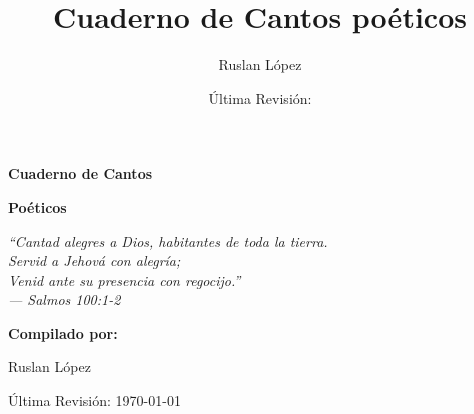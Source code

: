\documentclass[12pt, spanish]{book}
\title{Cuaderno de Cantos poéticos}
\author{Ruslan L\'opez}
\date{\'Ultima Revisi\'on:  \RevDate}
\newcommand{\RevDate}{\today}
\begin{document}
    \hypersetup{pageanchor=false}

    \begin{titlepage}
        \centering

        \vspace*{1cm}

        {\Huge\bfseries\sffamily{$\dagger$}\par}

        \vspace{1.5cm}

        {\Huge\bfseries\sffamily Cuaderno de Cantos\par}
        \vspace{0.5cm}
        {\Huge\bfseries\sffamily Po\'eticos\par}

        \vspace{2cm}

        \begin{center}
            \Large\itshape ``Cantad alegres a Dios, habitantes de toda la tierra.\\
            Servid a Jehov\'a con alegr\'ia;\\
            Venid ante su presencia con regocijo.''\\
            \vspace{0.3cm}
            --- Salmos 100:1-2
        \end{center}

        \vspace{2cm}

        {\Large\bfseries Compilado por:\par}
        \vspace{0.5cm}
        {\Large Ruslan L\'opez\par}

        \vfill

        {\large \'Ultima Revisi\'on: \RevDate\par}

        \vspace{1cm}

    \end{titlepage}
\end{document}

